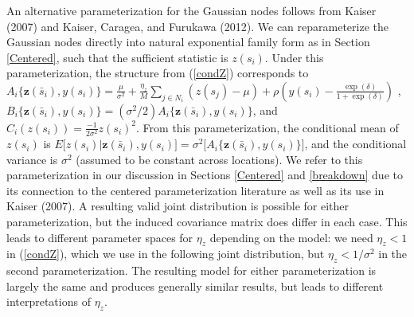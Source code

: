 \documentclass[12pt, a4paper, twoside]{article}
\begin{document}
An alternative parameterization for the Gaussian nodes follows from Kaiser (2007) and Kaiser, Caragea, and Furukawa (2012). We can reparameterize the Gaussian nodes directly into natural exponential family form as in Section \ref{Centered}, such that the sufficient statistic is $z(s_i)$. Under this parameterization, the structure from (\ref{condZ}) corresponds to
\begin{math}
A_i\lbrace \boldsymbol{z}(\bar{s}_i), y(s_i) \rbrace =  \frac{\mu}{\sigma^2} + \frac{\eta_z}{M} \sum_{j \in N_{i}} \left(z(s_j) - \mu\right)+ \rho\left(y(s_i) - \frac{\exp{(\delta)}}{1+\exp{(\delta)}}\right)
\end{math} , 
\begin{math}
B_i\lbrace \boldsymbol{z}(\bar{s}_i), y(s_i) \rbrace =  (\sigma^2/2)A_i\lbrace \boldsymbol{z}(\bar{s}_i), y(s_i) \rbrace
\end{math}, and
\begin{math}
C_i (z(s_i)) =  \frac{-1}{2\sigma^2} z(s_i)^2 
\end{math}.
From this parameterization, the conditional mean of $z(s_i)$ is $E\lbrack z(s_{i})|\boldsymbol{z}(\bar{s}_i) , y(s_{i})\rbrack=\sigma^2 \lbrack A_i\lbrace \boldsymbol{z}(\bar{s}_i), y(s_i) \rbrace\rbrack$, and the conditional variance is $\sigma^2$ (assumed to be constant across locations). We refer to this parameterization in our discussion in Sections \ref{Centered} and \ref{breakdown} due to its connection to the centered parameterization literature as well as its use in Kaiser (2007). A resulting valid joint distribution is possible for either parameterization, but the induced covariance matrix does differ in each case. This leads to different parameter spaces for $\eta_z$ depending on the model: we need $\eta_{z} < 1$ in (\ref{condZ}), which we use in the following joint distribution, but $\eta_z<1/\sigma^2$ in the second parameterization. The resulting model for either parameterization is largely the same and produces generally similar results, but leads to different interpretations of $\eta_z$.

\end{document}
